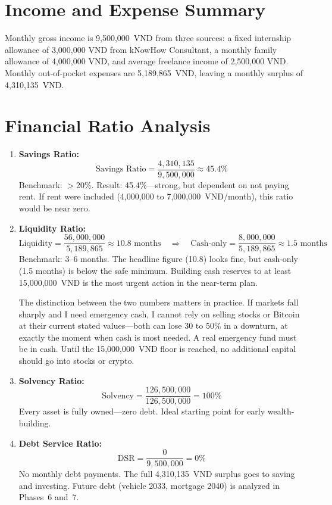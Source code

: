 \section{Income and Expense Summary}

Monthly gross income is 9,500,000~VND from three sources: a fixed internship allowance of 3,000,000 VND from kNowHow Consultant, a monthly family allowance of 4,000,000 VND, and average freelance income of 2,500,000 VND. Monthly out-of-pocket expenses are 5,189,865~VND, leaving a monthly surplus of 4,310,135~VND.

\section{Financial Ratio Analysis}

\begin{enumerate}
  \item \textbf{Savings Ratio:}
    \begin{equation*}
      \text{Savings Ratio} = \frac{4{,}310{,}135}{9{,}500{,}000} \approx 45.4\%
    \end{equation*}
    Benchmark: $>$20\%. Result: 45.4\%---strong, but dependent on not paying rent. If rent were included (4,000,000 to 7,000,000~VND/month), this ratio would be near zero.

  \item \textbf{Liquidity Ratio:}
    \begin{equation*}
      \text{Liquidity} = \frac{56{,}000{,}000}{5{,}189{,}865} \approx 10.8 \text{ months}
      \quad \Rightarrow \quad
      \text{Cash-only} = \frac{8{,}000{,}000}{5{,}189{,}865} \approx 1.5 \text{ months}
    \end{equation*}
    Benchmark: 3--6 months. The headline figure (10.8) looks fine, but cash-only (1.5 months) is below the safe minimum. Building cash reserves to at least 15,000,000~VND is the most urgent action in the near-term plan.

    The distinction between the two numbers matters in practice. If markets fall sharply and I need emergency cash, I cannot rely on selling stocks or Bitcoin at their current stated values---both can lose 30 to 50\% in a downturn, at exactly the moment when cash is most needed. A real emergency fund must be in cash. Until the 15,000,000~VND floor is reached, no additional capital should go into stocks or crypto.

  \item \textbf{Solvency Ratio:}
    \begin{equation*}
      \text{Solvency} = \frac{126{,}500{,}000}{126{,}500{,}000} = 100\%
    \end{equation*}
    Every asset is fully owned---zero debt. Ideal starting point for early wealth-building.

  \item \textbf{Debt Service Ratio:}
    \begin{equation*}
      \text{DSR} = \frac{0}{9{,}500{,}000} = 0\%
    \end{equation*}\nopagebreak[4]
    No monthly debt payments. The full 4,310,135~VND surplus goes to saving and investing. Future debt (vehicle 2033, mortgage 2040) is analyzed in Phases~6 and~7.
\end{enumerate}
